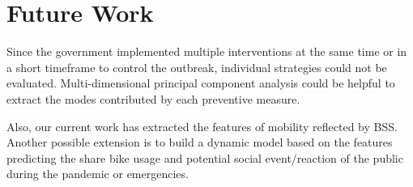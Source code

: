 \documentclass[ijgi,submit,moreauthors,pdftex]{Definitions/mdpi}
\begin{document}
\section{Future Work}\label{sec:future}

Since the government implemented multiple interventions at the same time or in a short timeframe to control the outbreak, individual strategies could not be evaluated.
Multi-dimensional principal component analysis could be helpful to extract the modes contributed by each preventive measure.

Also, our current work has extracted the features of mobility reflected by BSS.
Another possible extension is to build a dynamic model based on the features predicting the share bike usage and potential social event/reaction of the public during the pandemic or emergencies.



\vspace{6pt} 


\end{document}

